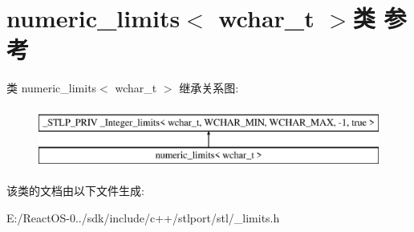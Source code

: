 \hypertarget{classnumeric__limits_3_01wchar__t_01_4}{}\section{numeric\+\_\+limits$<$ wchar\+\_\+t $>$类 参考}
\label{classnumeric__limits_3_01wchar__t_01_4}
类 numeric\+\_\+limits$<$ wchar\+\_\+t $>$ 继承关系图\+:\begin{figure}[H]
\begin{center}
\leavevmode
\includegraphics[height=2.000000cm]{classnumeric__limits_3_01wchar__t_01_4}
\end{center}
\end{figure}


该类的文档由以下文件生成\+:\begin{DoxyCompactItemize}
\item 
E\+:/\+React\+O\+S-\/0../sdk/include/c++/stlport/stl/\+\_\+limits.\+h\end{DoxyCompactItemize}
